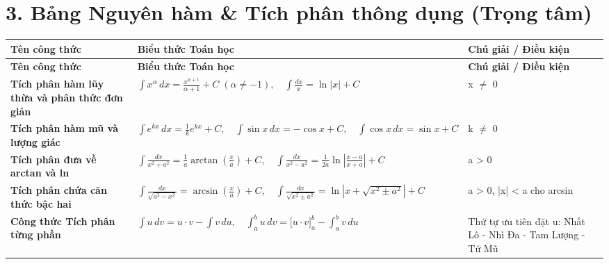 \documentclass[11pt,a4paper,oneside]{book}
\begin{document}
\section*{3. Bảng Nguyên hàm \& Tích phân thông dụng (Trọng tâm)}
\begin{longtable}{|p{}|p{}|p{}|}
\hline
\rowcolor{blue!10} \textbf{Tên công thức} & \textbf{Biểu thức Toán học} & \textbf{Chú giải / Điều kiện} \\ \hline
\endfirsthead
\hline
\rowcolor{blue!10} \textbf{Tên công thức} & \textbf{Biểu thức Toán học} & \textbf{Chú giải / Điều kiện} \\ \hline
\endhead
\textbf{Tích phân hàm lũy thừa và phân thức đơn giản} & $\displaystyle \int x^\alpha \,dx = \frac{x^{\alpha+1}}{\alpha+1} + C \;(\alpha \neq -1), \quad \int \frac{dx}{x} = \ln|x| + C$ & x $\neq$ 0 \\ \hline
\textbf{Tích phân hàm mũ và lượng giác} & $\displaystyle \int e^{kx}\,dx = \frac{1}{k}e^{kx} + C, \quad \int \sin x\,dx = -\cos x + C, \quad \int \cos x\,dx = \sin x + C$ & k $\neq$ 0 \\ \hline
\textbf{Tích phân đưa về arctan và ln} & $\displaystyle \int \frac{dx}{x^2 + a^2} = \frac{1}{a}\arctan\left(\frac{x}{a}\right) + C, \quad \int \frac{dx}{x^2 - a^2} = \frac{1}{2a}\ln\left|\frac{x-a}{x+a}\right| + C$ & a > 0 \\ \hline
\textbf{Tích phân chứa căn thức bậc hai} & $\displaystyle \int \frac{dx}{\sqrt{a^2 - x^2}} = \arcsin\left(\frac{x}{a}\right) + C, \quad \int \frac{dx}{\sqrt{x^2 \pm a^2}} = \ln\left|x + \sqrt{x^2 \pm a^2}\right| + C$ & a > 0, |x| < a cho arcsin \\ \hline
\textbf{Công thức Tích phân từng phần} & $\displaystyle \int u\,dv = u\cdot v - \int v\,du, \quad \int_a^b u\,dv = \Big[u\cdot v\Big]_a^b - \int_a^b v\,du$ & Thứ tự ưu tiên đặt u: Nhất Lô - Nhì Đa - Tam Lượng - Tứ Mũ \\ \hline
\end{longtable}
\end{document}
